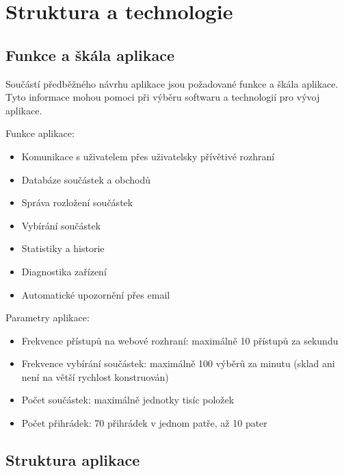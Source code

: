 \documentclass[12pt, a4paper, oneside]{article}
\begin{document}
\section{Struktura a technologie}

\subsection{Funkce a škála aplikace}

Součástí předběžného návrhu aplikace jsou požadované funkce a škála aplikace. Tyto informace mohou pomoci při výběru softwaru a technologií pro vývoj aplikace.

Funkce aplikace:

\begin{itemize}
\item Komunikace s uživatelem přes uživatelsky přívětivé rozhraní
\item Databáze součástek a obchodů
\item Správa rozložení součástek
\item Vybírání součástek
\item Statistiky a historie
\item Diagnostika zařízení
\item Automatické upozornění přes email
\end{itemize}

Parametry aplikace:

\begin{itemize}
\item Frekvence přístupů na webové rozhraní: maximálně 10 přístupů za sekundu
\item Frekvence vybírání součástek: maximálně 100 výběrů za minutu (sklad ani není na větší rychlost konstruován)
\item Počet součástek: maximálně jednotky tisíc položek
\item Počet přihrádek: 70 přihrádek v jednom patře, až 10 pater

\end{itemize}

\subsection{Struktura aplikace} %
\end{document}
